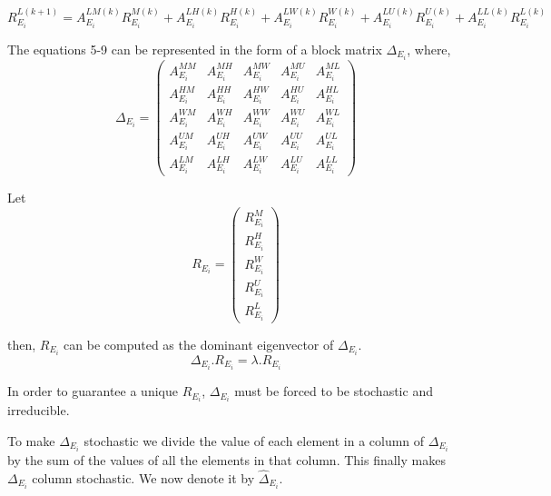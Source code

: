 \begin{equation}
R_{{E_{i}}}^{L(k+1)} = A_{E_{i}}^{LM(k)}R_{{E_{i}}}^{M(k)} + A_{E_{i}}^{LH(k)}R_{{E_{i}}}^{H(k)} +A_{E_{i}}^{LW(k)}R_{{E_{i}}}^{W(k)}+ A_{E_{i}}^{LU(k)}R_{{E_{i}}}^{U(k)}+ A_{E_{i}}^{LL(k)}R_{{E_{i}}}^{L(k)}
\end{equation}


The equations 5-9 can be represented in the form of a block matrix $\Delta_{E_{i}}$, where,
\[ \Delta_{E_{i}} = \left( \begin{array}{ccccc}
A_{E_{i}}^{MM} & A_{E_{i}}^{MH} & A_{E_{i}}^{MW} &  A_{E_{i}}^{MU} & A_{E_{i}}^{ML} \\
A_{E_{i}}^{HM} & A_{E_{i}}^{HH} & A_{E_{i}}^{HW} & A_{E_{i}}^{HU} & A_{E_{i}}^{HL} \\
A_{E_{i}}^{WM} & A_{E_{i}}^{WH} & A_{E_{i}}^{WW} & A_{E_{i}}^{WU} & A_{E_{i}}^{WL}\\
A_{E_{i}}^{UM} & A_{E_{i}}^{UH} & A_{E_{i}}^{UW} & A_{E_{i}}^{UU} & A_{E_{i}}^{UL} \\
A_{E_{i}}^{LM} & A_{E_{i}}^{LH} & A_{E_{i}}^{LW} & A_{E_{i}}^{LU} & A_{E_{i}}^{LL} \end{array} \right)\] 

Let \[R_{E_{i}} = \left( \begin{array}{c}
R_{{E_{i}}}^{M} \\
R_{{E_{i}}}^{H} \\
R_{{E_{i}}}^{W} \\
R_{{E_{i}}}^{U} \\
R_{{E_{i}}}^{L} \end{array} \right)\] 

then, $R_{E_{i}}$ can be computed as the dominant eigenvector of $\Delta_{E_{i}}$.
\begin{equation}
\Delta_{E_{i}}.R_{E_{i}} = \lambda.R_{E_{i}}
\end{equation}

In order to guarantee a unique $R_{E_{i}}$, $\Delta_{E_{i}}$ must be forced to be stochastic and irreducible. 

To make $\Delta_{E_{i}}$ stochastic we divide the value of each element in a column of $\Delta_{E_{i}}$ by the sum of the values of all the elements in that column. This finally makes $\Delta_{E_{i}}$ column stochastic. We now denote it by $\hat \Delta_{E_{i}}$.

